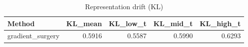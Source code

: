 \begin{table}[htbp]
\centering
\caption{Representation drift (KL)}
\label{tab:repr-drift}
\begin{tabular}{lrrrr}
\toprule
\textbf{Method} & \textbf{KL\_mean} & \textbf{KL\_low\_t} & \textbf{KL\_mid\_t} & \textbf{KL\_high\_t} \\
\midrule
gradient\_surgery & 0.5916 & 0.5587 & 0.5990 & 0.6293 \\
\bottomrule
\end{tabular}
\end{table}